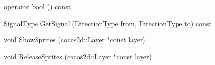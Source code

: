 \begin{DoxyCompactItemize}
\item 
\hyperlink{classrtm_1_1_control_unit_ab48f3a045d62fa1f251af2ece4b52d44}{operator bool} () const
\item 
\hyperlink{namespacertm_aadb7300c15d57429546fb0b7f8ee0ee6}{Signal\+Type} \hyperlink{classrtm_1_1_control_unit_afa3dcc399f2f5b7d0c1451aa65977da6}{Get\+Signal} (\hyperlink{namespacertm_a57b216f3aeb45041f3461bab08bc3aeb}{Direction\+Type} from, \hyperlink{namespacertm_a57b216f3aeb45041f3461bab08bc3aeb}{Direction\+Type} to) const
\item 
void \hyperlink{classrtm_1_1_control_unit_af126b136af6883970ded2a592c90d2b1}{Show\+Sprites} (cocos2d\+::\+Layer $\ast$const layer)
\item 
void \hyperlink{classrtm_1_1_control_unit_ac21d7c91d9c62fb58f29b2412ce4d4be}{Release\+Sprites} (cocos2d\+::\+Layer $\ast$const layer)
\end{DoxyCompactItemize}
